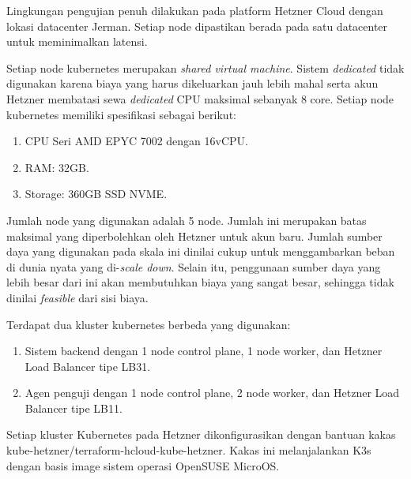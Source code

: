Lingkungan pengujian penuh dilakukan pada platform Hetzner Cloud dengan lokasi datacenter Jerman. Setiap node dipastikan berada pada satu datacenter untuk meminimalkan latensi.

Setiap node kubernetes merupakan \textit{shared virtual machine}. Sistem \textit{dedicated} tidak digunakan karena biaya yang harus dikeluarkan jauh lebih mahal serta akun Hetzner membatasi sewa \textit{dedicated} CPU maksimal sebanyak 8 core. Setiap node kubernetes memiliki spesifikasi sebagai berikut:

\begin{enumerate}
    \item CPU Seri AMD EPYC 7002 dengan 16vCPU.
    \item RAM: 32GB.
    \item Storage: 360GB SSD NVME.
\end{enumerate}

Jumlah node yang digunakan adalah 5 node. Jumlah ini merupakan batas maksimal yang diperbolehkan oleh Hetzner untuk akun baru. Jumlah sumber daya yang digunakan pada skala ini dinilai cukup untuk menggambarkan beban di dunia nyata yang di-\textit{scale down}. Selain itu, penggunaan sumber daya yang lebih besar dari ini akan membutuhkan biaya yang sangat besar, sehingga tidak dinilai \textit{feasible} dari sisi biaya.

Terdapat dua kluster kubernetes berbeda yang digunakan:

\begin{enumerate}
    \item Sistem backend dengan 1 node control plane, 1 node worker, dan Hetzner Load Balancer tipe LB31.
    \item Agen penguji dengan 1 node control plane, 2 node worker, dan Hetzner Load Balancer tipe LB11.
\end{enumerate}

Setiap kluster Kubernetes pada Hetzner dikonfigurasikan dengan bantuan kakas kube-hetzner/terraform-hcloud-kube-hetzner. Kakas ini melanjalankan K3s dengan basis image sistem operasi OpenSUSE MicroOS.